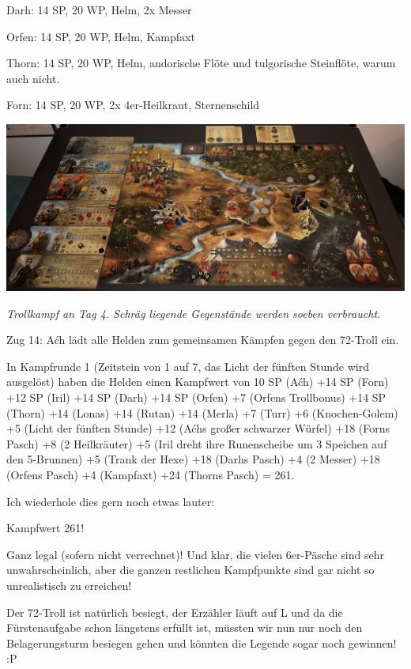 \documentclass[10pt, a4paper, oneside]{book}
\begin{document}
{Darh: 14 SP, 20 WP, Helm, 2x Messer

Orfen: 14 SP, 20 WP, Helm, Kampfaxt

Thorn: 14 SP, 20 WP, Helm, andorische Flöte und tulgorische Steinflöte, warum auch nicht.

Forn: 14 SP, 20 WP, 2x 4er-Heilkraut, Sternenschild\bigskip



\includegraphics[width=\textwidth]{Das Erbe des Wunderkindes/Bilder/Tag 4 Endkampf.jpg}

\textit{Trollkampf an Tag 4. Schräg liegende Gegenstände werden soeben verbraucht.}\bigskip

Zug 14: Aćh lädt alle Helden zum gemeinsamen Kämpfen gegen den 72-Troll ein.

In Kampfrunde 1 (Zeitstein von 1 auf 7, das Licht der fünften Stunde wird ausgelöst) haben die Helden einen Kampfwert von 10 SP (Aćh) +14 SP (Forn) +12 SP (Iril) +14 SP (Darh) +14 SP (Orfen) +7 (Orfens Trollbonus) +14 SP (Thorn) +14 (Lonas) +14 (Rutan) +14 (Merla) +7 (Turr) +6 (Knochen-Golem) +5 (Licht der fünften Stunde) +12 (Aćhs großer schwarzer Würfel) +18 (Forns Pasch) +8 (2 Heilkräuter) +5 (Iril dreht ihre Runenscheibe um 3 Speichen auf den 5-Brunnen) +5 (Trank der Hexe) +18 (Darhs Pasch) +4 (2 Messer) +18 (Orfens Pasch) +4 (Kampfaxt) +24 (Thorns Pasch) = 261.\bigskip



Ich wiederhole dies gern noch etwas lauter:

{\Large Kampfwert 261!}

Ganz legal (sofern nicht verrechnet)! Und klar, die vielen 6er-Päsche sind sehr unwahrscheinlich, aber die ganzen restlichen Kampfpunkte sind gar nicht so unrealistisch zu erreichen!\bigskip



Der 72-Troll ist natürlich besiegt, der Erzähler läuft auf L und da die Fürstenaufgabe schon längstens erfüllt ist, müssten wir nun nur noch den Belagerungsturm besiegen gehen und könnten die Legende sogar noch gewinnen! :P\bigskip



}
\end{document}
